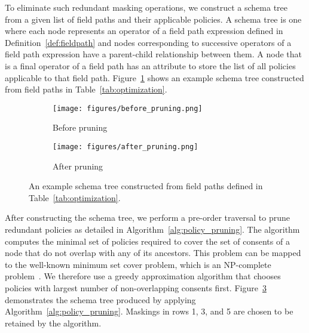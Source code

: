 To eliminate such redundant masking operations, we construct a schema tree from a given list of field paths and their applicable policies. 
A schema tree is one where each node represents an operator of a field path expression defined in Definition~\ref{def:fieldpath} and nodes corresponding to successive operators of a field path expression have a parent-child relationship between them. 
A node that is a final operator of a field path has an attribute to store the list of all policies applicable to that field path. 
Figure~\ref{fig:schematree} shows an example schema tree constructed from field paths in Table~\ref{tab:optimization}.
\begin{figure}[ht]  %
    \vspace{-1em}
    \begin{subfigure}[b]{0.45\columnwidth}
     \texttt{[image: figures/before\_pruning.png]}
     \caption{Before pruning}  %
         \label{fig:schematree}  %
     \end{subfigure}
     \hfill %
        \begin{subfigure}[b]{0.45\columnwidth}
         \texttt{[image: figures/after\_pruning.png]}
             \caption{After pruning}  %
                 \label{fig:prunedschematree}  %
     \end{subfigure}
     \vspace{-1em}
     \caption{An example schema tree constructed from field paths defined in Table~\ref{tab:optimization}.}
     \vspace{-1em}
 \end{figure}

After constructing the schema tree, we perform a pre-order traversal to prune redundant policies as detailed in Algorithm~\ref{alg:policy_pruning}. The algorithm computes the minimal set of policies required to cover the set of consents of a node that do not overlap with any of its ancestors. This problem can be mapped to the well-known minimum set cover problem, which is an NP-complete problem~\cite{Garey90}. We therefore use a greedy approximation algorithm that chooses policies with largest number of non-overlapping consents first.
Figure~\ref{fig:prunedschematree} demonstrates the schema tree produced by applying Algorithm~\ref{alg:policy_pruning}. 
Maskings in rows 1, 3, and 5 are chosen to be retained by the algorithm. 

